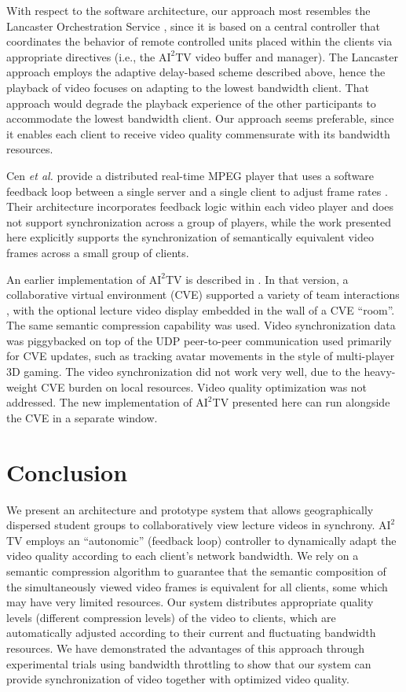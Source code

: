 \documentclass{sig-alternate}
\begin{document}
With respect to the software architecture, our approach most resembles
the Lancaster Orchestration Service \cite{Lancaster}, since it is
based on a central controller that coordinates the behavior of remote
controlled units placed within the clients via appropriate directives
(i.e., the $\mathrm{AI}^2$TV video buffer and manager).  The Lancaster
approach employs the adaptive delay-based scheme described above,
hence the playback of video focuses on adapting to the lowest
bandwidth client.  That approach would degrade the playback experience
of the other participants to accommodate the lowest bandwidth client.
Our approach seems preferable, since it enables each client to receive
video quality commensurate with its bandwidth resources.

Cen {\it et al.} provide a distributed real-time MPEG player that uses
a software feedback loop between a single server and a single client
to adjust frame rates \cite{CEN}.  Their architecture incorporates
feedback logic within each video player and does not support
synchronization across a group of players, while the work presented
here explicitly supports the synchronization of semantically
equivalent video frames across a small group of clients.

An earlier implementation of $\mathrm{AI}^2$TV is described in
\cite{VECTORS}.  In that version, a collaborative virtual environment
(CVE) supported a variety of team interactions \cite{CHIME}, with the
optional lecture video display embedded in the wall of a CVE ``room''.
The same semantic compression capability was used. Video
synchronization data was piggybacked on top of the UDP peer-to-peer
communication used primarily for CVE updates, such as tracking avatar
movements in the style of multi-player 3D gaming.  The video
synchronization did not work very well, due to the heavy-weight CVE
burden on local resources. Video quality optimization was not
addressed.  The new implementation of $\mathrm{AI}^2$TV presented here
can run alongside the CVE in a separate window.

\section{Conclusion}

We present an architecture and prototype system that allows
geographically dispersed student groups to collaboratively view
lecture videos in synchrony. $\mathrm{AI}^2$TV employs an
``autonomic'' (feedback loop) controller to dynamically adapt the
video quality according to each client's network bandwidth.  We rely
on a semantic compression algorithm to guarantee that the semantic
composition of the simultaneously viewed video frames is equivalent
for all clients, some which may have very limited resources.  Our
system distributes appropriate quality levels (different compression
levels) of the video to clients, which are automatically adjusted
according to their current and fluctuating bandwidth resources.  We
have demonstrated the advantages of this approach through experimental
trials using bandwidth throttling to show that our system can provide
synchronization of video together with optimized video quality.
\end{document}
